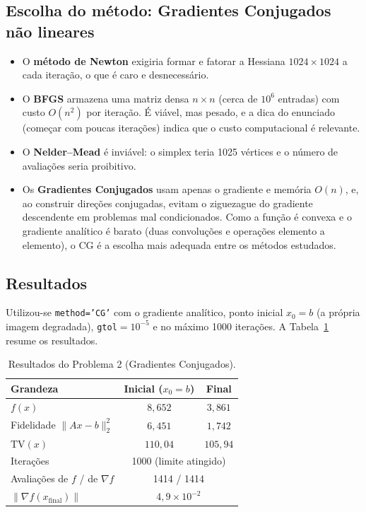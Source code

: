 \documentclass[12pt,a4paper]{article}
\begin{document}
\subsection{Escolha do método: Gradientes Conjugados não lineares}

\begin{itemize}
  \item O \textbf{método de Newton} exigiria formar e fatorar a Hessiana $1024\times1024$ a cada iteração, o que é caro e desnecessário.
  \item O \textbf{BFGS} armazena uma matriz densa $n\times n$ (cerca de $10^6$ entradas) com custo $O(n^2)$ por iteração. É viável, mas pesado, e a dica do enunciado (começar com poucas iterações) indica que o custo computacional é relevante.
  \item O \textbf{Nelder--Mead} é inviável: o simplex teria 1025 vértices e o número de avaliações seria proibitivo.
  \item Os \textbf{Gradientes Conjugados} usam apenas o gradiente e memória $O(n)$, e, ao construir direções conjugadas, evitam o ziguezague do gradiente descendente em problemas mal condicionados. Como a função é convexa e o gradiente analítico é barato (duas convoluções e operações elemento a elemento), o CG é a escolha mais adequada entre os métodos estudados.
\end{itemize}

\subsection{Resultados}

Utilizou-se \texttt{method='CG'} com o gradiente analítico, ponto inicial $x_0=b$ (a própria imagem degradada), \texttt{gtol}$=10^{-5}$ e no máximo 1000 iterações. A Tabela~\ref{tab:q2} resume os resultados.

\begin{table}[H]
\centering
\caption{Resultados do Problema 2 (Gradientes Conjugados).}
\label{tab:q2}
\begin{tabular}{@{}lcc@{}}
\toprule
Grandeza & Inicial ($x_0=b$) & Final \\
\midrule
$f(x)$ & $8{,}652$ & $3{,}861$ \\
Fidelidade $\|Ax-b\|_2^2$ & $6{,}451$ & $1{,}742$ \\
$\mathrm{TV}(x)$ & $110{,}04$ & $105{,}94$ \\
\midrule
Iterações & \multicolumn{2}{c}{1000 (limite atingido)} \\
Avaliações de $f$ / de $\nabla f$ & \multicolumn{2}{c}{1414 / 1414} \\
$\|\nabla f(x_{\mathrm{final}})\|$ & \multicolumn{2}{c}{$4{,}9\times10^{-2}$} \\
\bottomrule
\end{tabular}
\end{table}
\end{document}
